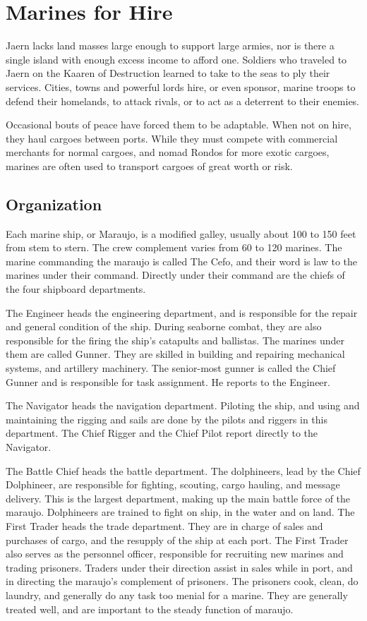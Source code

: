 \chapter{Marines for Hire}
\label{ch:marines}
Jaern lacks land masses large enough to support large armies, nor is there a single island with enough excess income to afford one. Soldiers who traveled to Jaern on the Kaaren of Destruction learned to take to the seas to ply their services. Cities, towns and powerful lords hire, or even sponsor, marine troops to defend their homelands, to attack rivals, or to act as a deterrent to their enemies.

Occasional bouts of peace have forced them to be adaptable. When not on hire, they haul cargoes between ports. While they must compete with commercial merchants for normal cargoes, and nomad Rondos for more exotic cargoes, marines are often used to transport cargoes of great worth or risk.

\section{Organization}

Each marine ship, or Maraujo, is a modified galley, usually about 100 to 150 feet from stem to stern. The crew complement varies from 60 to 120 marines. The marine commanding the maraujo is called The Cefo, and their word is law to the marines under their command. Directly under their
command are the chiefs of the four shipboard departments.

The Engineer heads the engineering department, and is responsible for the repair and general condition of the ship. During seaborne combat, they are also responsible for the firing the ship’s catapults and ballistas. The marines under them are called Gunner. They are skilled in building and repairing mechanical systems, and artillery machinery. The senior-most gunner is called the Chief Gunner and is responsible for task assignment. He reports to the Engineer.

The Navigator heads the navigation department. Piloting the ship, and using and maintaining the rigging and sails are done by the pilots and riggers in this department. The Chief Rigger and the Chief Pilot report directly to the Navigator.

The Battle Chief heads the battle department. The dolphineers, lead by the Chief Dolphineer, are responsible for fighting, scouting, cargo hauling, and message delivery. This is the largest department, making up the main battle force of the maraujo. Dolphineers are trained to fight on ship, in the water and on land. The First Trader heads the trade department. They are in charge of sales and purchases of cargo, and the resupply of the ship at each port. The First Trader also serves as the personnel officer, responsible for recruiting new marines and trading prisoners. Traders under their direction assist in sales while in port, and in directing the maraujo’s complement of prisoners. The prisoners cook, clean, do laundry, and generally do
any task too menial for a marine. They are generally treated well, and are important to the steady function of maraujo.

